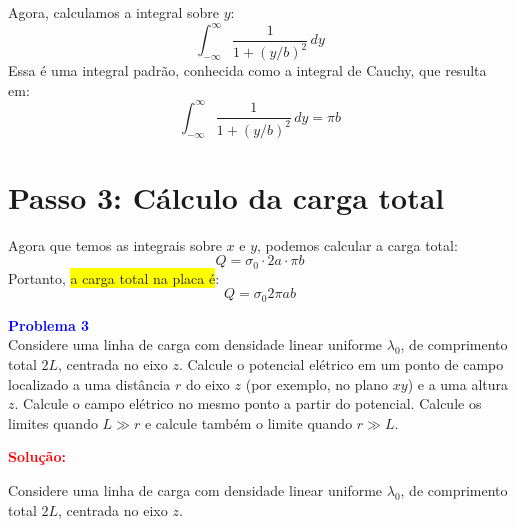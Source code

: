\documentclass[a4paper,12pt]{article}
\begin{document}
Agora, calculamos a integral sobre \(y\):
\begin{equation}
\int_{-\infty}^{\infty} \frac{1}{1 + (y/b)^2} \, dy
\end{equation}
Essa é uma integral padrão, conhecida como a integral de Cauchy, que resulta em:
\begin{equation}
\int_{-\infty}^{\infty} \frac{1}{1 + (y/b)^2} \, dy = \pi b
\end{equation}

\section*{Passo 3: Cálculo da carga total}

Agora que temos as integrais sobre \(x\) e \(y\), podemos calcular a carga total:
\begin{equation}
Q = \sigma_0 \cdot 2a \cdot \pi b
\end{equation}
Portanto, \colorbox{yellow}{a carga total na placa é}:
\begin{equation}
\boxed{Q = \sigma_0 2\pi a b }
\end{equation}

\begin{flushleft}
\textbf{\textcolor{blue}{\Large Problema 3}}\\
Considere uma linha de carga com densidade linear uniforme \( \lambda_0 \), de comprimento 
total \( 2L \), centrada no eixo \( z \). Calcule o potencial elétrico em um ponto de campo 
localizado a uma distância \( r \) do eixo \( z \) (por exemplo, no plano \( xy \)) e a uma 
altura \( z \). Calcule o campo elétrico no mesmo ponto a partir do potencial. Calcule os limites 
quando \( L \gg r \) e calcule também o limite quando \( r \gg L \).

\textcolor{red}{\textbf{Solução:}}\\
\end{flushleft}

Considere uma linha de carga com densidade linear uniforme \( \lambda_0 \), de comprimento total \( 2L \), 
centrada no eixo \( z \).
\end{document}
